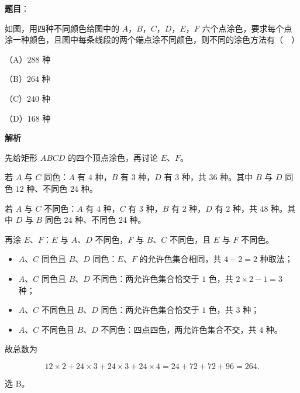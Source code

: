 \begin{answer}

\textbf{题目}：

如图，用四种不同颜色给图中的 $A$，$B$，$C$，$D$，$E$，$F$ 六个点涂色，要求每个点涂一种颜色，且图中每条线段的两个端点涂不同颜色，则不同的涂色方法有（　）
\nopagebreak[4]
\begin{center}\end{center}
\nopagebreak[4]
（A）$288$ 种

（B）$264$ 种

（C）$240$ 种

（D）$168$ 种

\textbf{解析}

先给矩形 $ABCD$ 的四个顶点涂色，再讨论 $E$、$F$。

若 $A$ 与 $C$ 同色：$A$ 有 $4$ 种，$B$ 有 $3$ 种，$D$ 有 $3$ 种，共 $36$ 种。其中 $B$ 与 $D$ 同色 $12$ 种、不同色 $24$ 种。

若 $A$ 与 $C$ 不同色：$A$ 有 $4$ 种，$C$ 有 $3$ 种，$B$ 有 $2$ 种，$D$ 有 $2$ 种，共 $48$ 种。其中 $D$ 与 $B$ 同色 $24$ 种、不同色 $24$ 种。

再涂 $E$、$F$：$E$ 与 $A$、$D$ 不同色，$F$ 与 $B$、$C$ 不同色，且 $E$ 与 $F$ 不同色。

\begin{itemize}
\item $A$、$C$ 同色且 $B$、$D$ 同色：$E$、$F$ 的允许色集合相同，共 $4-2=2$ 种取法；
\item $A$、$C$ 同色且 $B$、$D$ 不同色：两允许色集合恰交于 $1$ 色，共 $2\times2-1=3$ 种；
\item $A$、$C$ 不同色且 $B$、$D$ 同色：两允许色集合恰交于 $1$ 色，共 $3$ 种；
\item $A$、$C$ 不同色且 $B$、$D$ 不同色：四点四色，两允许色集合不交，共 $4$ 种。
\end{itemize}

故总数为

\nopagebreak[4]
\[12\times2+24\times3+24\times3+24\times4=24+72+72+96=264.\]

选 B。


\end{answer}
